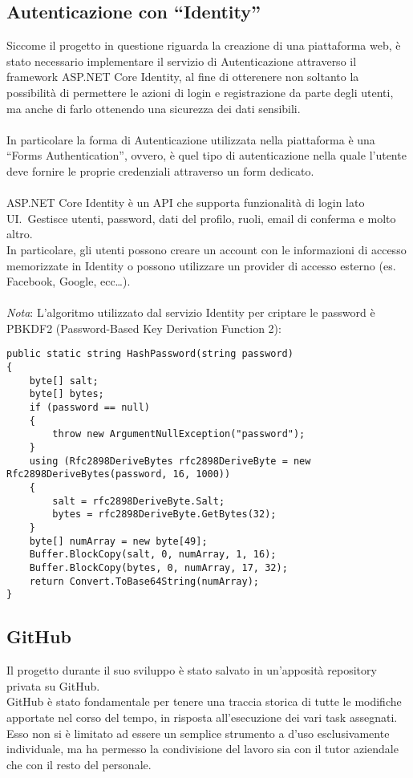 \subsection{Autenticazione con ``Identity''}\label{sec:cap_sec_subsec}
Siccome il progetto in questione riguarda la creazione di una piattaforma web, è stato necessario
implementare il servizio di Autenticazione attraverso il framework ASP.NET Core Identity, al
fine di otterenere non soltanto la possibilità di permettere le azioni di login e registrazione da parte degli utenti, ma
anche di farlo ottenendo una sicurezza dei dati sensibili. 
\\ \\
In particolare la forma di Autenticazione utilizzata nella piattaforma è una ``Forms Authentication'', ovvero, è quel tipo di
autenticazione nella quale l'utente deve fornire le proprie credenziali attraverso un form dedicato. 
\\ \\
ASP.NET Core Identity è un API che supporta funzionalità di login lato UI.\ Gestisce utenti,
password, dati del profilo, ruoli, email di conferma e molto altro. \\
In particolare, gli utenti possono creare un account con le informazioni di accesso memorizzate in Identity 
o possono utilizzare un provider di accesso esterno (es. Facebook, Google, ecc\dots ).
\\ \\
\textit{Nota}: L'algoritmo utilizzato dal servizio Identity per criptare le password è PBKDF2 (Password-Based Key Derivation Function 2):
\begin{lstlisting}[style=cs_style, caption=algoritmo di hashing per criptare le password usato dal servizio Identity]
public static string HashPassword(string password)
{
    byte[] salt;
    byte[] bytes;
    if (password == null)
    {
        throw new ArgumentNullException("password");
    }
    using (Rfc2898DeriveBytes rfc2898DeriveByte = new Rfc2898DeriveBytes(password, 16, 1000))
    {
        salt = rfc2898DeriveByte.Salt;
        bytes = rfc2898DeriveByte.GetBytes(32);
    }
    byte[] numArray = new byte[49];
    Buffer.BlockCopy(salt, 0, numArray, 1, 16);
    Buffer.BlockCopy(bytes, 0, numArray, 17, 32);
    return Convert.ToBase64String(numArray);
}
    \end{lstlisting}


\subsection{GitHub}\label{sec:cap_sec_subsec}
Il progetto durante il suo sviluppo è stato salvato in un'apposità repository privata
su GitHub. \\
GitHub è stato fondamentale per tenere una traccia storica di tutte le
modifiche apportate nel corso del tempo, in risposta all'esecuzione dei vari task assegnati. \\
Esso non si è limitato ad essere un semplice strumento a d'uso esclusivamente
individuale, ma ha permesso la condivisione del lavoro sia con il tutor 
aziendale che con il resto del personale.
